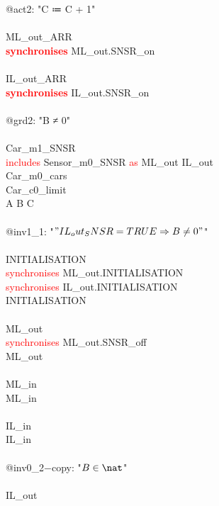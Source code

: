 \begin{description}
\begin{center}
\begin{Bcode}
			@act2: "C ≔ C + 1"\\
			\Bend\\
			ML_out_ARR\\
			\textcolor{red}{\textbf{synchronises}} ML_out.SNSR_on\\
			\Bend\\
			IL_out_ARR\\
			\textcolor{red}{\textbf{synchronises}} IL_out.SNSR_on\\
			\Bwhen\\
			@grd2: "B ≠ 0"\\
			\Bend\\
			\Bend
			\else
			\Bmachine{} Car_m1_SNSR\\
			\textcolor{red}{includes} Sensor_m0_SNSR \textcolor{red}{as} ML_out IL_out\\
			\Brefines{} Car_m0_cars\\
			\Bsees{} Car_c0_limit\\
			\Bvariables{} A B C\\
			\Binvariants\\
			\Btab @inv1_1: "\("IL_out_SNSR = TRUE \Rightarrow B \neq 0"\)"\\
			\Bevents\\
			\Btab INITIALISATION \Bextended\\
            \Btab \textcolor{red}{synchronises} ML_out.INITIALISATION\\
            \Btab \textcolor{red}{synchronises} IL_out.INITIALISATION\\
            \Btab \Brefines{} INITIALISATION\\
			\Btab \Bend\\
			\Btab ML_out \Bextended\\
			\Btab \textcolor{red}{synchronises} ML_out.SNSR_off\\
			\Btab \Brefines{} ML_out\\
			\Btab \Bend\\
			\Btab ML_in \Bextended\\
			\Btab \Brefines{} ML_in\\
			\Btab \Bend\\
			\Btab IL_in \Bextended\\
			\Btab \Brefines{} IL_in\\
			\Btab \Bwhen\\
			\Btab \Btab @inv0_2−copy: "\(B \in \nat\)" \Btheorem\\
			\Btab \Bend\\
			\Btab IL_out\\

\end{Bcode}
\end{center}
\end{description}
